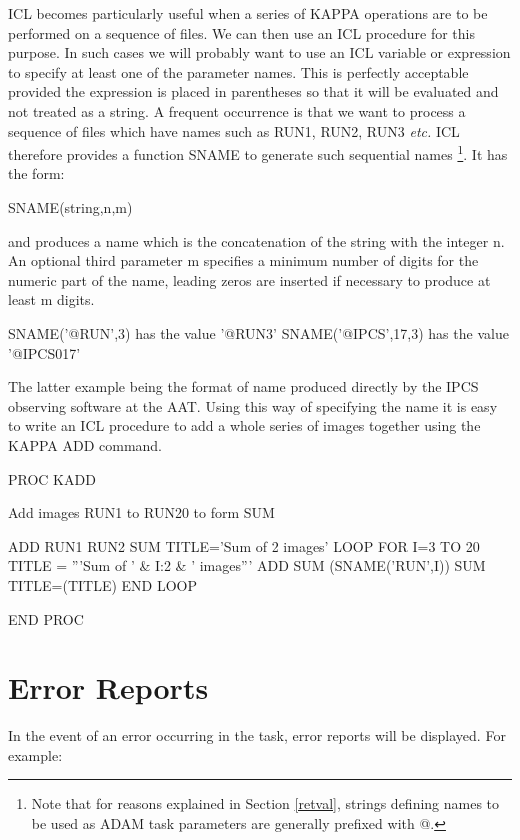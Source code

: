 \documentclass[twoside,11pt,nolof,chapters]{starlink}
\begin{document}
ICL becomes particularly useful when a series of KAPPA operations are to
be performed on a sequence of files. We can then use an ICL procedure for
this purpose. In such cases we will probably want to use an ICL variable
or expression to specify at least one of the parameter names. This is
perfectly acceptable provided the expression is placed in parentheses so
that it will be evaluated and not treated as a string. A frequent occurrence
is that we want to process a sequence of files which have names such as
RUN1, RUN2, RUN3 \emph{etc.} ICL therefore provides a function SNAME to generate
such sequential names
\footnote{Note that for reasons explained in Section \ref{retval}, strings
defining names to be used as ADAM task parameters are generally prefixed with
@.}.
It has the form:
\begin{terminalv}
    SNAME(string,n,m)
\end{terminalv}

and produces a name which is the concatenation of the string with the integer
n. An optional third parameter m specifies a minimum number of digits for
the numeric part of the name, leading zeros are inserted if necessary to
produce at least m digits.
\begin{terminalv}
    SNAME('@RUN',3)      has the value   '@RUN3'
    SNAME('@IPCS',17,3)  has the value   '@IPCS017'
\end{terminalv}
The latter example being the format of name produced directly by the IPCS
observing software at the AAT. Using this way of specifying the name it
is easy to write an ICL procedure to add a whole series of images together
using the KAPPA ADD command.

\begin{terminalv}
    PROC KADD

    {   Add images RUN1 to RUN20 to form SUM  }

       ADD RUN1 RUN2 SUM TITLE='Sum of 2 images'
       LOOP FOR I=3 TO 20
         TITLE = '''Sum of ' & I:2 & ' images'''
         ADD  SUM  (SNAME('RUN',I))  SUM  TITLE=(TITLE)
       END LOOP

    END PROC
\end{terminalv}

\section{Error Reports}
In the event of an error occurring in the task, error reports will be
displayed. For example:
\end{document}
